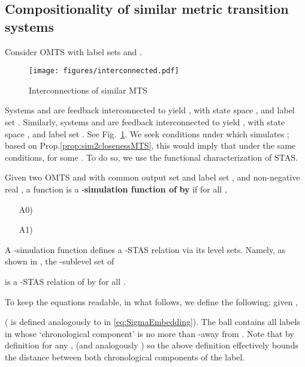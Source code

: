 \subsection{Compositionality of similar metric transition systems}
\label{sec:interconnectingMTS}

\newcommand \qot {q_{12}}
\newcommand{\qtf}{q_{34}}
\newcommand{\vot}{V_{13}}
\newcommand{\vtf}{V_{24}}
\newcommand{\bVot}{\underbar{V}_{13}}
\newcommand{\bVtf}{\underbar{V}_{24}}
\newcommand{\bV}{\underbar{V}}
\newcommand{\lblSetc}[1]{{\tlabelSet}_{#1}}
\newcommand{\Bttf}{B_\tau^{34}(\slabel_{12})}

Consider OMTS  with label sets  and .
\begin{figure}
	\centering
		\texttt{[image: figures/interconnected.pdf]}
	\caption{Interconnections of similar MTS}
	\label{fig:interconnected}
\end{figure}
Systems  and  are feedback interconnected to yield , 
with state space , and label set .
Similarly, systems  and  are feedback interconnected to yield ,
with state space , and label set .
See Fig.~\ref{fig:interconnected}.
We seek conditions under which  simulates ;
based on Prop.\ref{prop:sim2closenessMTS}, this would imply that under the same conditions,  for some .
To do so, we use the functional characterization of STAS.
\begin{definition}\cite[Def. 3.2]{JuliusP_ApxSynchronizationMTS06}
\label{def:stas fnt omts}
Given two OMTS  and  with common output set  and label set ,
and non-negative real ,
a function  is a -\textbf{simulation function of}  \textbf{by}  if 
for all ,
\begin{enumerate}
	\item[A0)] 
	\item[A1)] 	
\end{enumerate}
\end{definition}
 A -simulation function defines a -STAS relation via its level sets. 
Namely, as shown in \cite[Thm. 3.4]{JuliusP_ApxSynchronizationMTS06}, the -sublevel set of 

is a -STAS relation of  by  for all . 

To keep the equations readable, in what follows, we define the following:
given ,


( is defined analogously to  in \eqref{eq:SigmaEmbedding}).
The ball  contains all labels in  whose `chronological component'  is no more than -away from .
Note that by definition for any ,  (and analogously ) so the above definition effectively bounds the distance between both chronological components of the label.

